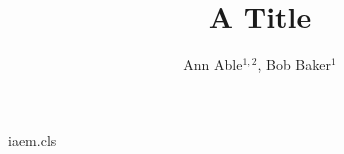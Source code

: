 \begin{filecontents*}[overwrite]{iaem.cls}
\RequirePackage{hyperref}
\newcount\iaemcount {}
\def\affiliation#1{\expandafter\protected@xdef\csname iaem\the\iaemcount\endcsname{#1}%
  \global\advance\iaemcount1 }
\def\printaffil{{\count@=0 \loop\ifnum\count@<\iaemcount
  \csname iaem\the\count@\endcsname\par\advance\count@1 \repeat}}
\newif\iffinals
\newcommand{\email}[1]{\iffinals#1\else\href{mailto:#1}{#1}\fi}
\def\@maketitle{\begin{center}{\LARGE\@title\par}\vskip1em{\large\@author\par}\vskip1em
  {\small\printaffil}\end{center}}
\end{filecontents*}
\documentclass{iaem}

\title{A Title}
\author{Ann Able$^{1,2}$, Bob Baker$^{1}$}
\maketitle
Text.

